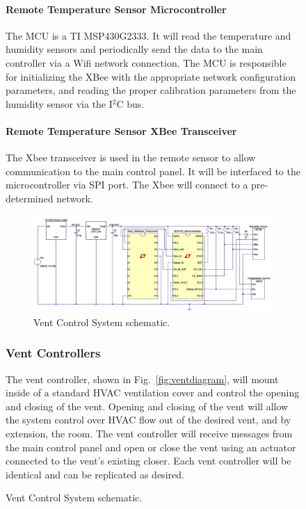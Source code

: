 \begin{figure}
\paragraph{Remote Temperature Sensor Microcontroller}
The MCU is a TI MSP430G2333.  It will read the temperature and humidity sensors and periodically send the data to the main controller via a Wifi network connection.  The MCU is responsible for initializing the XBee with the appropriate network configuration parameters, and reading the proper calibration parameters from the humidity sensor via the I$^2$C bus.
\paragraph{Remote Temperature Sensor XBee Transceiver}
The Xbee transceiver is used in the remote sensor to allow communication to the main control panel. It will be interfaced to the microcontroller via SPI port.  The Xbee will connect to a pre-determined network.

\begin{figure} [htb]
\centering
\includegraphics[width=.99\textwidth]{Vent_System.JPG}
\caption{Vent Control System schematic.}
\label{fig:Vent_System}
\end{figure}

\subsubsection{Vent Controllers}
The vent controller, shown in Fig.~\ref{fig:ventdiagram}, will mount inside of a standard HVAC ventilation cover and control the opening and closing of the vent.  Opening and closing of the vent will allow the system control over HVAC flow out of the desired vent, and by extension, the room. The vent controller will receive messages from the main control panel and open or close the vent using an actuator connected to the vent's existing closer. Each vent controller will be identical and can be replicated as desired.

\end{figure}
